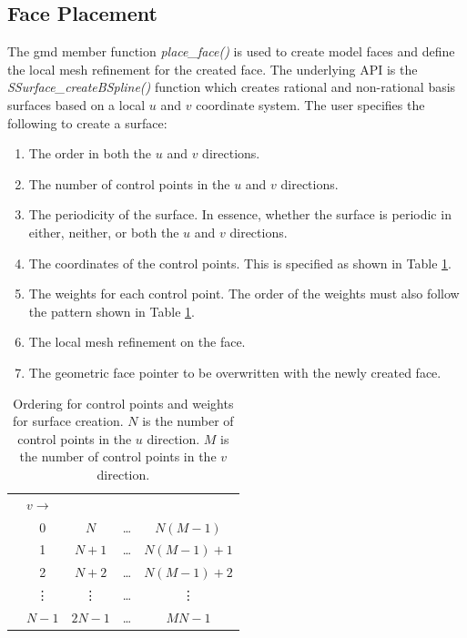 \documentclass[a4paper, 12pt]{article}
\begin{document}
\subsection{Face Placement} \label{subsec:face}
The gmd member function \emph{place\_face()} is used to create model 
faces and define the local mesh refinement for the created face. The
underlying API is the \emph{SSurface\_createBSpline()} function which
creates rational and non-rational basis surfaces 
based on a local $u$ and $v$ 
coordinate system.  The user specifies the following to create a surface:
\begin{enumerate}
  \item The order in both the $u$ and $v$ directions.
  \item The number of control points in the $u$ and $v$ directions.
  \item The periodicity of the surface. In essence, whether the 
      surface is periodic in either, neither, 
      or both the $u$ and $v$ directions.
  \item The coordinates of the control points. This is specified as shown in
      Table \ref{table:cpNum}.
  \item The weights for each control point. The order of the weights must
      also follow the pattern shown in Table \ref{table:cpNum}.
  \item The local mesh refinement on the face. 
  \item The geometric face pointer to be overwritten
       with the newly created face.
\end{enumerate}

\begin{table}[H]
  \centering
  \begin{tabular}{l |c c c c |}
    \multicolumn{1}{c}{} & \multicolumn{4}{l}{ $v\longrightarrow$}\\
    \cline{2-5}
    \parbox[t]{2mm}{
        {}} 
    &0        & $N$     & \dots  & $N(M-1)$   \\
    &1        & $N+1$   & \dots  & $N(M-1)+1$ \\
    &2        & $N+2$   & \dots  & $N(M-1)+2$ \\
    &\vdots   & \vdots  & \dots  & \vdots     \\
    &$N-1$    & $2N-1$  & \dots  & $MN-1$     \\
  \end{tabular}
  \caption{Ordering for control points and 
    weights for surface creation. $N$ is 
    the number of control points in the $u$ direction. $M$ is the number of
    control points in the $v$ direction.}
  \label{table:cpNum}
\end{table}
\end{document}

